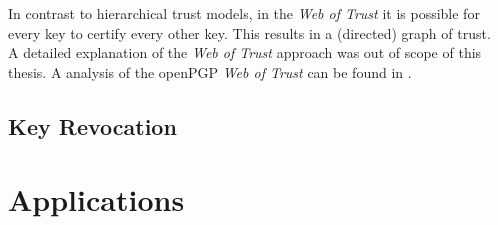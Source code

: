 In contrast to hierarchical trust models, in the \textit{Web of Trust} it is possible for every key to certify every other key. 
This results in a (directed) graph of trust. \\


A detailed explanation of the \textit{Web of Trust} approach was out of scope of this thesis. A analysis of the openPGP \textit{Web of Trust} can be found in \cite{Ulrich2011}. 

\subsection{Key Revocation}








\section{Applications}







